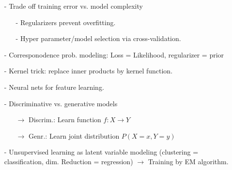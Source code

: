 \begin{itemize}
    \item[-]Trade off training error vs. model complexity
    \begin{itemize}
        \item[-]Regularizers prevent overfitting.
        \item[-]Hyper parameter/model selection via cross-validation.
    \end{itemize}{}
    \item[-]Corresponodence prob. modeling: Loss = Likelihood, regularizer = prior
    \item[-]Kernel trick: replace inner products by kernel function.
    \item[-]Neural nets for feature learning.
    \item[-]Discriminative vs. generative models
    \begin{itemize}
        \item[$\rightarrow$]Discrim.: Learn function $f: X \rightarrow Y$
        \item[$\rightarrow$]Genr.: Learn joint distribution $P(X=x, Y=y)$
    \end{itemize}{}
    \item[-]Unsupervised learning as latent variable modeling (clustering = classification, dim. Reduction = regression)
    $\rightarrow$ Training by EM algorithm.
\end{itemize}{}
\\